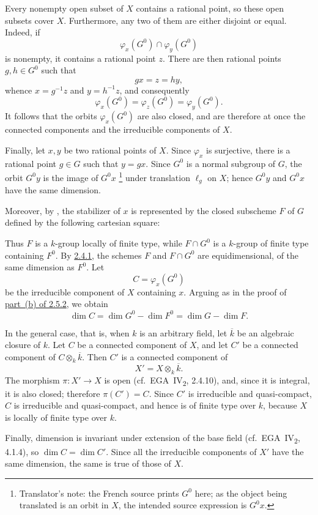 Every nonempty open subset of \(X\) contains a rational point, so these
open subsets cover \(X\). Furthermore, any two of them are either
disjoint or equal. Indeed, if
\[
  \varphi_x(G^0)\cap\varphi_y(G^0)
\]
is nonempty, it contains a rational point \(z\). There are then
rational points \(g,h\in G^0\) such that
\[
  gx=z=hy,
\]
whence \(x=g^{-1}z\) and \(y=h^{-1}z\), and consequently
\[
  \varphi_x(G^0)=\varphi_z(G^0)=\varphi_y(G^0).
\]
It follows that the orbits \(\varphi_x(G^0)\) are also closed, and are
therefore at once the connected components and the irreducible
components of \(X\).

Finally, let \(x,y\) be two rational points of \(X\). Since
\(\varphi_x\) is surjective, there is a rational point \(g\in G\) such
that \(y=gx\). Since \(G^0\) is a normal subgroup of \(G\), the orbit
\(G^0y\) is the image of \(G^0x\)\begingroup
\renewcommand{\thefootnote}{\fnsymbol{footnote}}%
\footnote[1]{Translator's note: the French source prints \(G^0\) here;
as the object being translated is an orbit in \(X\), the intended
source expression is \(G^0x\).}%
\endgroup
under translation \(\ell_g\) on
\(X\); hence \(G^0y\) and \(G^0x\) have the same dimension.

Moreover, by , the stabilizer of \(x\) is represented
by the closed subscheme \(F\) of \(G\) defined by the following
cartesian square:
\begin{center}
  \label{diag:sga3-VIA-2.5.4-stabilizer}%
\end{center}
Thus \(F\) is a \(k\)-group locally of finite type, while
\(F\cap G^0\) is a \(k\)-group of finite type containing \(F^0\). By
\hyperref[cor:sga3-VIA-2.4.1]{2.4.1}, the schemes \(F\) and
\(F\cap G^0\) are equidimensional, of the same dimension as \(F^0\).
Let
\[
  C=\varphi_x(G^0)
\]
be the irreducible component of \(X\) containing \(x\). Arguing as in
the proof of \hyperref[prop:sga3-VIA-2.5.2]{part~(b) of 2.5.2}, we
obtain
\[
  \dim C=\dim G^0-\dim F^0=\dim G-\dim F.
\]

In the general case, that is, when \(k\) is an arbitrary field, let
\(\overline{k}\) be an algebraic closure of \(k\). Let \(C\) be a
connected component of \(X\), and let \(C'\) be a connected component
of \(C\otimes_k\overline{k}\). Then \(C'\) is a connected component of
\[
  X'=X\otimes_k\overline{k}.
\]
The morphism \(\pi:X'\to X\) is open (cf.\
EGA~IV\textsubscript{2}, 2.4.10), and, since it is integral, it is also
closed; therefore \(\pi(C')=C\). Since \(C'\) is irreducible and
quasi-compact, \(C\) is irreducible and quasi-compact, and hence is of
finite type over \(k\), because \(X\) is locally of finite type over
\(k\).

Finally, dimension is invariant under extension of the base field
(cf.\ EGA~IV\textsubscript{2}, 4.1.4), so
\(\dim C=\dim C'\). Since all the irreducible components of \(X'\) have
the same dimension, the same is true of those of \(X\).

